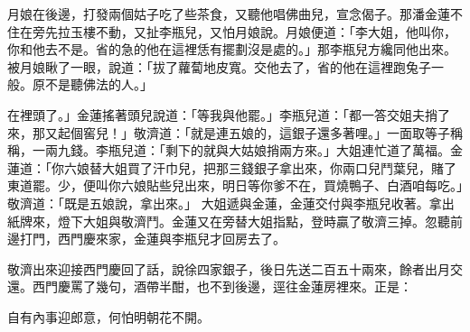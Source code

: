 月娘在後邊，打發兩個姑子吃了些茶食，又聽他唱佛曲兒，宣念偈子。那潘金蓮不住在旁先拉玉樓不動，又扯李瓶兒，又怕月娘說。月娘便道：「李大姐，他叫你，你和他去不是。省的急的他在這裡恁有擺劃沒是處的。」那李瓶兒方纔同他出來。被月娘瞅了一眼，說道：「拔了蘿蔔地皮寬。交他去了，省的他在這裡跑兔子一般。原不是聽佛法的人。」

在裡頭了。」金蓮搖著頭兒說道：「等我與他罷。」李瓶兒道：「都一答交姐夫捎了來，那又起個窖兒！」敬濟道：「就是連五娘的，這銀子還多著哩。」一面取等子稱稱，一兩九錢。李瓶兒道：「剩下的就與大姑娘捎兩方來。」大姐連忙道了萬福。金蓮道：「你六娘替大姐買了汗巾兒，把那三錢銀子拿出來，你兩口兒鬥葉兒，賭了東道罷。少，便叫你六娘貼些兒出來，明日等你爹不在，買燒鴨子、白酒咱每吃。」敬濟道：「既是五娘說，拿出來。」 大姐遞與金蓮，金蓮交付與李瓶兒收著。拿出紙牌來，燈下大姐與敬濟鬥。金蓮又在旁替大姐指點，登時贏了敬濟三掉。忽聽前邊打門，西門慶來家，金蓮與李瓶兒才回房去了。

敬濟出來迎接西門慶回了話，說徐四家銀子，後日先送二百五十兩來，餘者出月交還。西門慶罵了幾句，酒帶半酣，也不到後邊，逕往金蓮房裡來。正是：

自有內事迎郎意，何怕明朝花不開。

